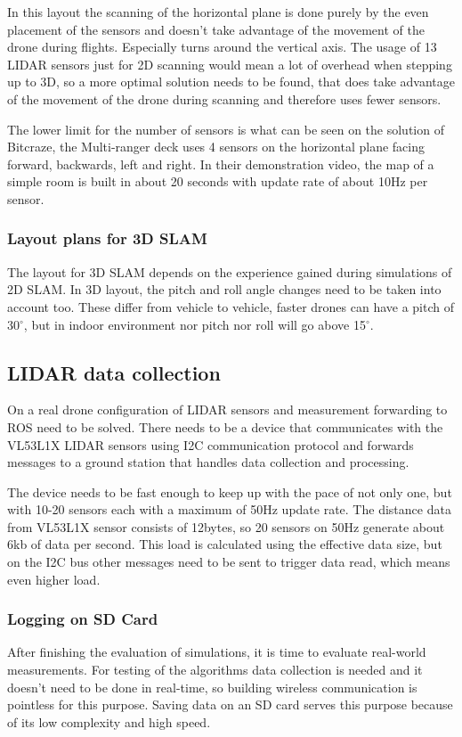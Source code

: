In this layout the scanning of the horizontal plane is done purely by the even placement of the sensors 
and doesn't take advantage of the movement of the drone during flights. Especially turns around the 
vertical axis. The usage of 13 LIDAR sensors just for 2D scanning would mean a lot of overhead when 
stepping up to 3D, so a more optimal solution needs to be found, that does take advantage of the movement 
of the drone during scanning and therefore uses fewer sensors.

The lower limit for the number of sensors is what can be seen on the solution of Bitcraze, 
the Multi-ranger deck\cite{BitcrazeMultirangerDeck} uses 4 sensors on the horizontal plane facing forward, 
backwards, left and right. In their demonstration video, the map of a simple room is built in 
about 20 seconds with update rate of about 10Hz per sensor. 

\subsubsection{Layout plans for 3D SLAM}
The layout for 3D SLAM depends on the experience gained during simulations of 2D SLAM. In 3D layout,
the pitch and roll angle changes need to be taken into account too. These differ from vehicle to vehicle,
faster drones can have a pitch of 30$^{\circ}$, but in indoor environment nor pitch nor roll will go above
15$^{\circ}$. 

\subsection{LIDAR data collection}
On a real drone configuration of LIDAR sensors and measurement forwarding to ROS need to be solved. 
There needs to be a device that communicates with the VL53L1X LIDAR sensors using I2C communication 
protocol and forwards messages to a ground station that handles data collection and processing.

The device needs to be fast enough to keep up with the pace of not only one, but with 10-20 sensors
each with a maximum of 50Hz update rate. The distance data from VL53L1X sensor consists of 12bytes, 
so 20 sensors on 50Hz generate about 6kb of data per second. This load is calculated using the 
effective data size, but on the I2C bus other messages need to be sent to trigger data read,
which means even higher load.

\subsubsection{Logging on SD Card}
After finishing the evaluation of simulations, it is time to evaluate real-world measurements. 
For testing of the algorithms data collection is needed and it doesn't need to be done in real-time,
so building wireless communication is pointless for this purpose. Saving data on an SD card serves this
purpose because of its low complexity and high speed. 

